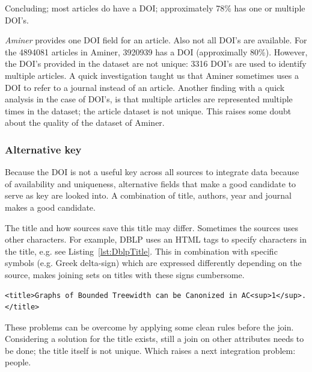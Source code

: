 \documentclass{ou-report}
\newcommand{\doi}{{DOI}}
\newcommand{\dblp}{DBLP}
\begin{document}
Concluding; most articles do have a \doi{}; approximately 78\% has one or multiple 
\doi{}'s.

\emph{Aminer} provides one \doi{} field for an article. Also not all DOI's are
available. For the 4894081 articles in Aminer, 3920939 has a \doi{}
(approximally 80\%). However, the \doi{}'s provided in the dataset are not
unique: 3316 DOI's are used to identify multiple articles. A quick investigation
taught us that Aminer 
sometimes uses a \doi{} to refer to a journal instead of an article. Another 
finding with a quick analysis in the case of \doi{}'s, is that multiple articles
are represented multiple times in the dataset; the article dataset is not 
unique. This raises some doubt about the quality of the dataset of Aminer.

\subsubsection{Alternative key}
Because the \doi{} is not a useful key across all sources to integrate data 
because of availability and uniqueness, alternative fields that make a good 
candidate to serve as key are looked into. 
A combination of title, authors, year and journal makes a good candidate.

The title and how sources save this title may differ. 
Sometimes the sources uses other characters. For example, \dblp{} uses an HTML
tags to specify characters in the title, e.g. see 
Listing~\ref{lst:DblpTitle}. This in combination 
with specific symbols (e.g. Greek delta-sign) which are expressed differently 
depending on the source, makes joining sets on titles with these signs
cumbersome.

\lstset{language=XML}
\begin{lstlisting}[caption={Example title in \dblp{}},label={lst:DblpTitle}]
<title>Graphs of Bounded Treewidth can be Canonized in AC<sup>1</sup>.</title>
\end{lstlisting}

These problems can be overcome by applying some clean rules before the join. 
Considering a solution for the title exists, still a join on other attributes
needs to be done; the title itself is not unique.
Which raises a next integration problem: people.

\end{document}
